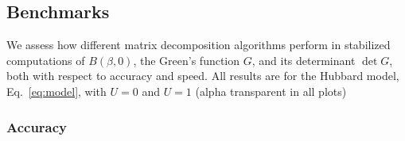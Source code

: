 \documentclass[submission, Phys]{SciPost}
\newcommand{\ssmall}{\scalebox{0.9}{s}}
\newcommand{\smedium}{\scalebox{1.3}{s}}
\newcommand{\slarge}{\scalebox{1.7}{s}}
\begin{document}

\subsection{Benchmarks}\label{sec:benchmarks}

We assess how different matrix decomposition algorithms perform in stabilized computations of $B(\beta, 0)$, the Green's function $G$, and its determinant $\det G$, both with respect to accuracy and speed. All results are for the Hubbard model, Eq.~\ref{eq:model}, with $U=0$ and $U=1$ (alpha transparent in all plots)

\subsubsection{Accuracy}
\end{document}
